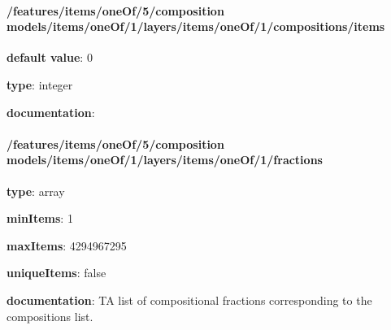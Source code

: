 \begin{itemized}
\paragraph{/features/items/oneOf/5/composition models/items/oneOf/1/layers/items/oneOf/1/compositions/items} \begin{itemized}
\item {\bf default value}: 0
\item {\bf type}: integer
\item {\bf documentation}: 
\end{itemized}\end{itemized}\paragraph{/features/items/oneOf/5/composition models/items/oneOf/1/layers/items/oneOf/1/fractions} \begin{itemized}
\item {\bf type}: array
\item {\bf minItems}: 1
\item {\bf maxItems}: 4294967295
\item {\bf uniqueItems}: false
\item {\bf documentation}: TA list of compositional fractions corresponding to the compositions list.

\end{itemized}
